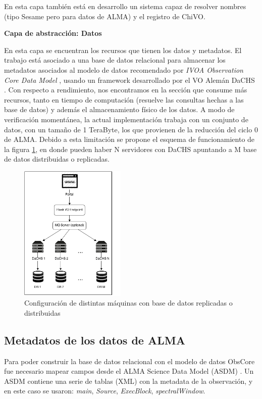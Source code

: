 En esta capa también está en desarrollo un sistema capaz de resolver nombres
(tipo Sesame \cite{sesame} pero para datos de ALMA) y el registro de ChiVO.

\textbf{Capa de abstracción: Datos}

En esta capa se encuentran los recursos que tienen los datos y metadatos.  El
trabajo está asociado a una base de datos relacional para almacenar los
metadatos asociados al modelo de datos recomendado por \emph{IVOA Observation
Core Data Model} \cite{louys2011ivoa}, usando un framework desarrollado por el
VO Alemán DaCHS \cite{dachs}.  Con respecto a rendimiento, nos encontramos en
la sección que consume más recursos, tanto en tiempo de computación (resuelve
las consultas hechas a las base de datos) y además el almacenamiento físico de
los datos.  A modo de verificación momentánea, la actual implementación trabaja
con un conjunto de datos, con un tamaño de 1 TeraByte, los que provienen de la
reducción del ciclo 0 de ALMA.  Debido a esta limitación se propone el esquema
de funcionamiento de la figura \ref{fig:dachs}, en donde pueden haber N
servidores con DaCHS apuntando a M base de datos distribuidas o replicadas.

\begin{figure}[ht]
    \centering
    \includegraphics[width=0.45\textwidth]{images/interaccion.png}
    \caption{Configuración de distintas máquinas con base de datos replicadas o distribuidas}
    \label{fig:dachs}
\end{figure}

\subsection{Metadatos de los datos de ALMA}

Para poder construir la base de datos relacional con el modelo de datos ObsCore
fue necesario mapear campos desde el ALMA Science Data Model (ASDM)
\cite{viallefond2009sdm}.  Un ASDM contiene una serie de tablas (XML) con la
metadata de la observación, y en este caso se usaron: \emph{main},
\emph{Source}, \emph{ExecBlock}, \emph{spectralWindow}.

